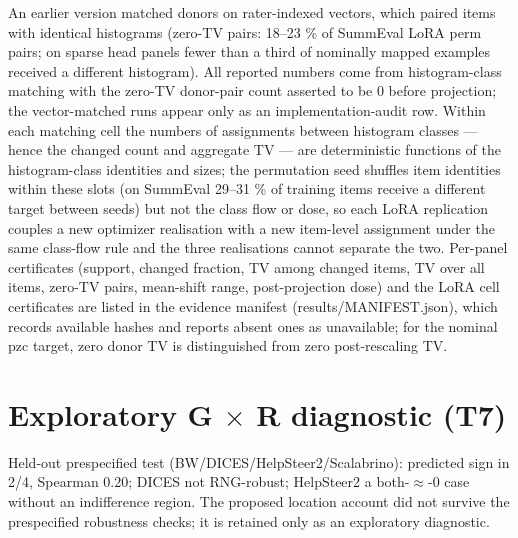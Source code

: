 \documentclass[10pt]{article}
\begin{document}
An earlier version matched donors on rater-indexed vectors, which paired items with identical histograms (zero-TV pairs: 18--23 \% of SummEval LoRA perm pairs; on sparse head panels fewer than a third of nominally mapped examples received a different histogram). All reported numbers come from histogram-class matching with the zero-TV donor-pair count asserted to be 0 before projection; the vector-matched runs appear only as an implementation-audit row. Within each matching cell the numbers of assignments between histogram classes --- hence the changed count and aggregate TV --- are deterministic functions of the histogram-class identities and sizes; the permutation seed shuffles item identities within these slots (on SummEval 29--31 \% of training items receive a different target between seeds) but not the class flow or dose, so each LoRA replication couples a new optimizer realisation with a new item-level assignment under the same class-flow rule and the three realisations cannot separate the two. Per-panel certificates (support, changed fraction, TV among changed items, TV over all items, zero-TV pairs, mean-shift range, post-projection dose) and the LoRA cell certificates are listed in the evidence manifest (results/MANIFEST.json), which records available hashes and reports absent ones as unavailable; for the nominal pzc target, zero donor TV is distinguished from zero post-rescaling TV.

\section{Exploratory G $\times$ R diagnostic (T7)}

Held-out prespecified test (BW/DICES/HelpSteer2/Scalabrino): predicted sign in 2/4, Spearman 0.20; DICES not RNG-robust; HelpSteer2 a both-$\approx$-0 case without an indifference region. The proposed location account did not survive the prespecified robustness checks; it is retained only as an exploratory diagnostic.



\end{document}
